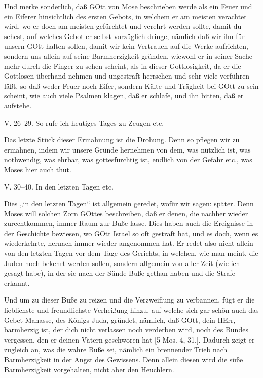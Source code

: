 Und merke sonderlich, daß GOtt von Mose beschrieben werde als ein Feuer und ein Eiferer hinsichtlich des ersten Gebots, in welchem er am meisten verachtet wird, wo er doch am meisten gefürchtet und verehrt werden sollte, damit du sehest, auf welches Gebot er selbst vorzüglich dringe, nämlich daß wir ihn für unsern GOtt halten sollen, damit wir kein Vertrauen auf die Werke aufrichten, sondern uns allein auf seine Barmherzigkeit gründen, wiewohl er in seiner Sache mehr durch die Finger zu sehen scheint, als in dieser Gottlosigkeit, da er die Gottlosen überhand nehmen und ungestraft herrschen und sehr viele verführen läßt, so daß weder Feuer noch Eifer, sondern Kälte und Trägheit bei GOtt zu sein scheint, wie auch viele Psalmen klagen, daß er schlafe, und ihn bitten, daß er aufstehe.

\begin{schriftzitat}
V. 26–29. So rufe ich heutiges Tages zu Zeugen etc.
\end{schriftzitat}

Das letzte Stück dieser Ermahnung ist die Drohung. Denn so pflegen wir zu ermahnen, indem wir unsere Gründe hernehmen von dem, was nützlich ist, was nothwendig, was ehrbar, was gottesfürchtig ist, endlich von der Gefahr etc., was Moses hier auch thut.

\begin{schriftzitat}
V. 30–40. In den letzten Tagen etc.
\end{schriftzitat}

Dies „in den letzten Tagen“ ist allgemein geredet, wofür wir sagen: später. Denn Moses will solchen Zorn GOttes beschreiben, daß er denen, die nachher wieder zurechtkommen, immer Raum zur Buße lasse. Dies haben auch die Ereignisse in der Geschichte bewiesen, wo GOtt Israel so oft gestraft hat, und es doch, wenn es wiederkehrte, hernach immer wieder angenommen hat. Er redet also nicht allein von den letzten Tagen vor dem Tage des Gerichts, in welchen, wie man meint, die Juden noch bekehrt werden sollen, sondern allgemein von aller Zeit (wie ich gesagt habe), in der sie nach der Sünde Buße gethan haben und die Strafe erkannt.

Und um zu dieser Buße zu reizen und die Verzweiflung zu verbannen, fügt er die lieblichste und freundlichste Verheißung hinzu, auf welche sich gar schön auch das Gebet Manasse, des Königs Juda, gründet, nämlich, daß GOtt, dein HErr, barmherzig ist, der dich nicht verlassen noch verderben wird, noch des Bundes vergessen, den er deinen Vätern geschworen hat [5 Mos. 4, 31.]. Dadurch zeigt er zugleich an, was die wahre Buße sei, nämlich ein brennender Trieb nach Barmherzigkeit in der Angst des Gewissens. Denn allein diesen wird die süße Barmherzigkeit vorgehalten, nicht aber den Heuchlern.

